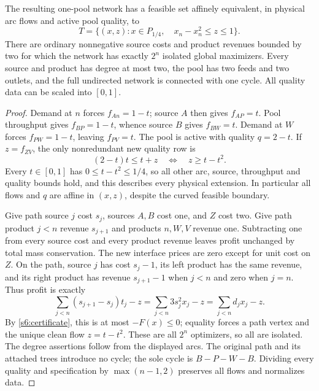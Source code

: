\begin{theorem}\label{s6:vertex-forcing}
The resulting one-pool network has a feasible set affinely equivalent,
in physical arc flows and active pool quality, to
\begin{equation}
 T=\{(x,z):x\in P_{1/4},\quad x_n-x_n^2\le z\le1\}.
 \label{s6:T}
\end{equation}
There are ordinary nonnegative source costs and product revenues bounded
by two for which the network has exactly $2^n$ isolated global maximizers.
Every source and product has degree at most two, the pool has two feeds
and two outlets, and the full undirected network is connected with one
cycle. All quality data can be scaled into $[0,1]$.
\end{theorem}
\begin{proof}
Demand at $n$ forces $f_{An}=1-t$; source $A$ then gives $f_{AP}=t$.
Pool throughput gives $f_{BP}=1-t$, whence source $B$ gives $f_{BW}=t$.
Demand at $W$ forces $f_{PW}=1-t$, leaving $f_{PV}=t$.
The pool is active with quality $q=2-t$. If $z=f_{ZV}$, the only
nonredundant new quality row is
\[
 (2-t)t\le t+z\quad\Longleftrightarrow\quad z\ge t-t^2.
\]
Every $t\in[0,1]$ has $0\le t-t^2\le1/4$, so all other arc,
source, throughput and quality bounds hold, and this describes every
physical extension. In particular all flows and $q$ are affine in
$(x,z)$, despite the curved feasible boundary.

Give path source $j$ cost $s_j$, sources $A,B$ cost one, and $Z$ cost
two. Give path product $j<n$ revenue $s_{j+1}$ and products $n,W,V$
revenue one. Subtracting one from every source cost and every product
revenue leaves profit unchanged by total mass conservation. The new
interface prices are zero except for unit cost on $Z$. On the path,
source $j$ has cost $s_j-1$, its left product has the same revenue,
and its right product has revenue $s_{j+1}-1$ when $j<n$ and zero
when $j=n$. Thus profit is exactly
\begin{equation}
 \sum_{j<n}(s_{j+1}-s_j)t_j-z
 =\sum_{j<n}3s_j^2x_j-z=\sum_{j<n}d_jx_j-z.
 \label{s6:geometry-profit}
\end{equation}
By \cref{s6:certificate}, this is at most $-F(x)\le0$; equality forces
a path vertex and the unique clean flow $z=t-t^2$. These are all
$2^n$ optimizers, so all are isolated. The degree assertions follow from
the displayed arcs. The original path and its attached trees introduce
no cycle; the sole cycle is $B-P-W-B$. Dividing every quality and
specification by $\max(n-1,2)$ preserves all flows and normalizes data.
\end{proof}

